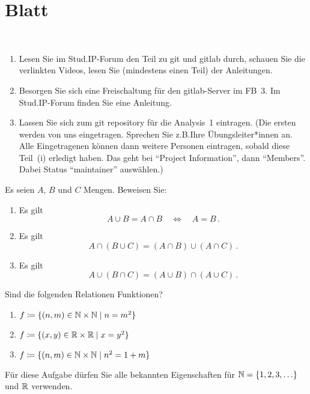 \section{Blatt}


\begin{aufg}[2 Punkte]\mbox{ }
\begin{enumerate}[label=$\mathrm{(\roman*)}$, ref=$\mathrm{\roman*}$]
\item Lesen Sie im Stud.IP-Forum den Teil zu git und gitlab durch, schauen Sie die verlinkten Videos, lesen Sie (mindestens einen Teil) der Anleitungen.
\item Besorgen Sie sich eine Freischaltung für den gitlab-Server im FB~3. Im Stud.IP-Forum finden Sie eine Anleitung.
\item Lassen Sie sich zum git repository f\"ur die Analysis~1 eintragen. (Die ersten werden von uns eingetragen. Sprechen Sie z.B.\@ Ihre \"Ubungsleiter*innen an. Alle Eingetragenen k\"onnen dann weitere Personen eintragen, sobald diese Teil~(i) erledigt haben. Das geht bei ``Project Information'', dann ``Members''. Dabei Status ``maintainer'' ausw\"ahlen.) 
\end{enumerate}
\end{aufg}

\bigskip

\begin{aufg}[6 Punkte]
Es seien $A$, $B$ und $C$ Mengen. Beweisen Sie: 
\begin{enumerate}[label=$\mathrm{(\roman*)}$, ref=$\mathrm{\roman*}$]
 \item Es gilt 
 \[
  A\cup B = A\cap B \quad\Leftrightarrow\quad  A=B\,.
 \]
 \item Es gilt 
 \[
  A \cap (B \cup C) = (A\cap B) \cup (A\cap C)\,.
 \]
 \item Es gilt 
 \[
  A \cup (B \cap C) = (A\cup B) \cap (A\cup C)\,.
 \]
\end{enumerate}
\end{aufg}
 
\bigskip 

\begin{lsg}
 
\end{lsg} 

\bigskip


\begin{aufg}[6 Punkte]
Sind die folgenden Relationen Funktionen?
\begin{enumerate}[label=$\mathrm{(\roman*)}$, ref=$\mathrm{\roman*}$]
\item $f \coloneqq \{(n,m)\in \mathbb{N}\times\mathbb{N} \mid n=m^2\}$
\item $f \coloneqq \{(x,y)\in \mathbb{R}\times\mathbb{R} \mid x=y^2\}$
\item $f \coloneqq \{(n,m)\in \mathbb{N}\times\mathbb{N} \mid n^2=1+m\}$
\end{enumerate}
F\"ur diese Aufgabe d\"urfen Sie alle bekannten Eigenschaften f\"ur $\mathbb{N}=\{1,2,3,\ldots\}$ und $\mathbb{R}$ verwenden.
\end{aufg}

